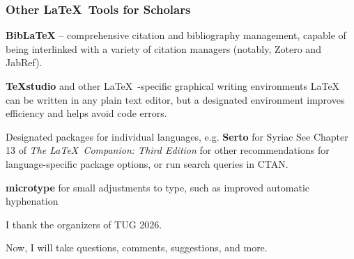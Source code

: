 \documentclass[aspectratio=169]{beamer}
\begin{document}
\begin{frame}
	\frametitle[Other \LaTeX\ software]{Other \LaTeX\ Tools for Scholars}

\textbf{BibLaTeX} -- comprehensive citation and bibliography management, capable of being interlinked with a variety of citation managers (notably, Zotero and JabRef). \break

\textbf{TeXstudio} and other \LaTeX\ -specific graphical writing environments \break
LaTeX can be written in any plain text editor, but a designated environment improves efficiency and helps avoid code errors. \break

Designated packages for individual languages, e.g. \textbf{Serto} for Syriac \break 
See Chapter 13 of \textit{The \LaTeX\ Companion: Third Edition} for other recommendations for language-specific package options, or run search queries in CTAN. \break

\textbf{microtype} for small adjustments to type, such as improved automatic hyphenation

\end{frame}

\begin{frame}

I thank the organizers of TUG 2026. \break

Now, I will take questions, comments, suggestions, and more.
	
\end{frame}
\end{document}
